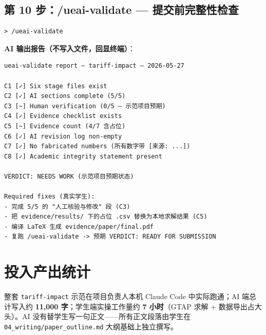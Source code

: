 \documentclass[12pt,a4paper]{article}
\begin{document}
\subsection{第 10 步：/ueai-validate — 提交前完整性检查}

\begin{lstlisting}[style=prompt]
> /ueai-validate
\end{lstlisting}

\noindent\textbf{AI 输出报告（不写入文件，回显终端）}：
\begin{lstlisting}[style=shell]
ueai-validate report — tariff-impact — 2026-05-27

C1 [✓] Six stage files exist
C2 [✓] AI sections complete (5/5)
C3 [~] Human verification (0/5 — 示范项目预期)
C4 [✓] Evidence checklist exists
C5 [~] Evidence count (4/7 含占位)
C6 [✓] AI revision log non-empty
C7 [✓] No fabricated numbers (所有数字带 [来源: ...])
C8 [✓] Academic integrity statement present

VERDICT: NEEDS WORK (示范项目预期状态)

Required fixes (真实学生):
- 完成 5/5 的 "人工核验与修改" 段 (C3)
- 把 evidence/results/ 下的占位 .csv 替换为本地求解结果 (C5)
- 编译 LaTeX 生成 evidence/paper/final.pdf
- 复跑 /ueai-validate -> 预期 VERDICT: READY FOR SUBMISSION
\end{lstlisting}

\section{投入产出统计}

整套 \texttt{tariff-impact} 示范在项目负责人本机 Claude Code 中实际跑通；AI 端总计写入约 \textbf{11{,}000 字}；学生端实操工作量约 \textbf{7 小时}（GTAP 求解 + 数据导出占大头）。AI 没有替学生写一句正文——所有正文段落由学生在 \texttt{04\_writing/paper\_outline.md} 大纲基础上独立撰写。
\end{document}
